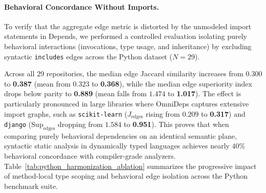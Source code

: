 \paragraph{Behavioral Concordance Without Imports.}
To verify that the aggregate edge metric is distorted by the unmodeled import
statements in Depends, we performed a controlled evaluation isolating purely
behavioral interactions (invocations, type usage, and inheritance) by excluding
syntactic \texttt{includes} edges across the Python dataset ($N = 29$).

Across all 29 repositories, the median edge Jaccard similarity increases from
$0.300$ to \textbf{0.387} (mean from $0.323$ to \textbf{0.368}), while the
median edge superiority index drops below parity to \textbf{0.889} (mean falls
from $1.474$ to \textbf{1.017}). The effect is particularly pronounced in large
libraries where OmniDeps captures extensive import graphs, such as
\texttt{scikit-learn} ($J_{\text{edges}}$ rising from $0.209$ to
\textbf{0.317}) and \texttt{django} ($\text{Sup}_{\text{edges}}$ dropping from
$1.584$ to \textbf{0.951}). This proves that when comparing purely behavioral
dependencies on an identical semantic plane, syntactic static analysis in
dynamically typed languages achieves nearly $40\%$ behavioral concordance with
compiler-grade analyzers. Table~\ref{tab:python_harmonization_ablation}
summarizes the progressive impact of method-local type scoping and behavioral
edge isolation across the Python benchmark suite.

